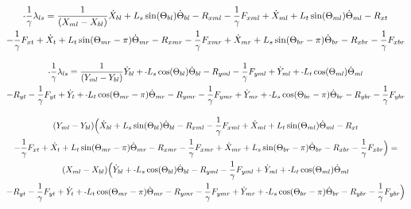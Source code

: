 \documentclass[11pt, landscape]{article}
\newcommand{\mn}{\scalebox{0.7}[1.0]{-}}
\begin{document}
\begin{multline}
\mn\frac{1}{\gamma}\lambda_{ls} =
\frac{1}{(X_{ml} - X_{bl})}\dot{X}_{bl} + L_{s}\sin(\Theta_{bl})      \dot{\Theta}_{bl} - R_{xml} - \frac{1}{\gamma}F_{xml} + \dot{X}_{ml} + L_{t}\sin(\Theta_{ml}) \dot{\Theta}_{ml} - R_{xt } \\
- \frac{1}{\gamma}F_{xt } + \dot{X}_{t } + L_{t}\sin(\Theta_{mr}-\pi)  \dot{\Theta}_{mr} - R_{xmr}
-\frac{1}{\gamma}F_{xmr} + \dot{X}_{mr} + L_{s}\sin(\Theta_{br}-\pi)  \dot{\Theta}_{br} - R_{xbr} - \frac{1}{\gamma}F_{xbr}
\end{multline}

\begin{multline}
\mn\frac{1}{\gamma}\lambda_{ls} =
\frac{1}{(Y_{ml} - Y_{bl})}\dot{Y}_{bl} + \mn L_{s}\cos(\Theta_{bl})      \dot{\Theta}_{bl} - R_{yml} - \frac{1}{\gamma}F_{yml} + \dot{Y}_{ml} + \mn L_{t}\cos(\Theta_{ml}) \dot{\Theta}_{ml} \\
- R_{yt} - \frac{1}{\gamma}F_{yt } + \dot{Y}_{t } + \mn L_{t}\cos(\Theta_{mr}-\pi)  \dot{\Theta}_{mr} - R_{ymr} - \frac{1}{\gamma}F_{ymr} + \dot{Y}_{mr}
+ \mn L_{s}\cos(\Theta_{br}-\pi)  \dot{\Theta}_{br} - R_{ybr} - \frac{1}{\gamma}F_{ybr}
\end{multline}

\begin{multline}
(Y_{ml} - Y_{bl})\Big( \dot{X}_{bl} + L_{s}\sin(\Theta_{bl})      \dot{\Theta}_{bl} - R_{xml} - \frac{1}{\gamma}F_{xml} + \dot{X}_{ml} + L_{t}\sin(\Theta_{ml}) \dot{\Theta}_{ml} - R_{xt } \\
- \frac{1}{\gamma}F_{xt } + \dot{X}_{t } + L_{t}\sin(\Theta_{mr}-\pi)  \dot{\Theta}_{mr} - R_{xmr} 
-\frac{1}{\gamma}F_{xmr} + \dot{X}_{mr} + L_{s}\sin(\Theta_{br}-\pi)  \dot{\Theta}_{br} - R_{xbr} - \frac{1}{\gamma}F_{xbr} \Big) = \\
(X_{ml} - X_{bl})\Big( \dot{Y}_{bl} + \mn L_{s}\cos(\Theta_{bl})      \dot{\Theta}_{bl} - R_{yml} - \frac{1}{\gamma}F_{yml} + \dot{Y}_{ml} + \mn L_{t}\cos(\Theta_{ml}) \dot{\Theta}_{ml} \\
- R_{yt} - \frac{1}{\gamma}F_{yt } + \dot{Y}_{t } + \mn L_{t}\cos(\Theta_{mr}-\pi)  \dot{\Theta}_{mr} - R_{ymr} - \frac{1}{\gamma}F_{ymr} + \dot{Y}_{mr}
+ \mn L_{s}\cos(\Theta_{br}-\pi)  \dot{\Theta}_{br} - R_{ybr} - \frac{1}{\gamma}F_{ybr} \Big)
\end{multline}
\end{document}
